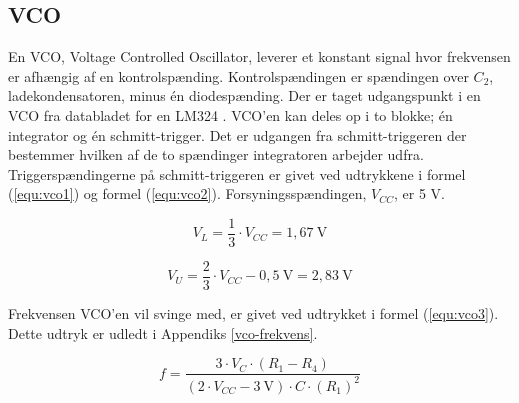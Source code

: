 \subsection*{VCO}
\label{volumenkontrol-design-vco}

En VCO, Voltage Controlled Oscillator, leverer et konstant signal hvor frekvensen er afhængig af en kontrolspænding. Kontrolspændingen er spændingen over $C_2$, ladekondensatoren, minus én diodespænding. Der er taget udgangspunkt i en VCO fra databladet for en LM324 \cite{lm324-datablad}. VCO'en kan deles op i to blokke; én integrator og én schmitt-trigger. Det er udgangen fra schmitt-triggeren der bestemmer hvilken af de to spændinger integratoren arbejder udfra. Triggerspændingerne på schmitt-triggeren er givet ved udtrykkene i formel (\ref{equ:vco1}) og formel (\ref{equ:vco2}). Forsyningsspændingen, $V_{CC}$, er 5 V.

\begin{equation}
\label{equ:vco1}
V_L = \frac{1}{3} \cdot V_{CC} = 1,67~\mathrm{V}
\end{equation}

\begin{equation}
\label{equ:vco2}
V_U = \frac{2}{3} \cdot V_{CC} - 0,5~\mathrm{V} = 2,83~\mathrm{V}
\end{equation}

Frekvensen VCO'en vil svinge med, er givet ved udtrykket i formel (\ref{equ:vco3}). Dette udtryk er udledt i Appendiks \ref{vco-frekvens}.

\begin{equation}
\label{equ:vco3}
f = \frac{3 \cdot V_C \cdot (R_1 - R_4)}{(2 \cdot V_{CC} - 3~\mathrm{V}) \cdot C \cdot (R_1)^2}
\end{equation}

